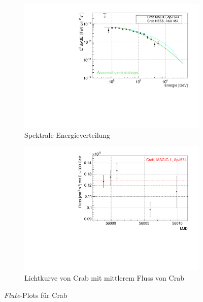\begin{figure}
\begin{subfigure}{0.45\linewidth}
  \label{Datenset2_SpectralShape_Crab}
  \end{subfigure}
  \hfill
  \begin{subfigure}{0.45\linewidth}
  \includegraphics[width=\textwidth]{./Plots/04_MrkAnalyse/Datenset2/Crab_SED.pdf}
  \caption{Spektrale Energieverteilung}
  \label{Datenset2_SED_Crab}
  \end{subfigure}
  \hfill
  \begin{subfigure}{0.45\linewidth}
  \includegraphics[width=\textwidth]{./Plots/04_MrkAnalyse/Datenset2/Crab_LC.pdf}
  \caption{Lichtkurve von Crab mit mittlerem Fluss von Crab}
  \label{Datenset2_LC_Crab}
  \end{subfigure}
  \hfill
\caption{\textit{Flute}-Plots für Crab}
\label{Datenset2_Flute_Plots_Crab}
\end{figure}

